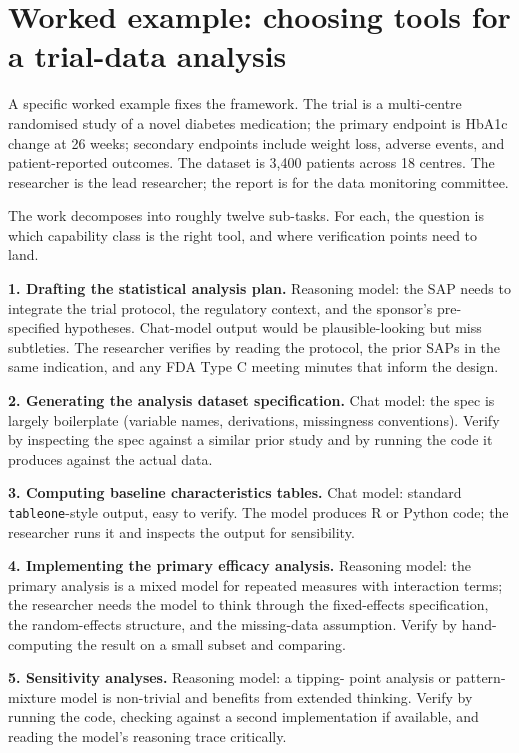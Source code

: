 \documentclass[
  letterpaper,
  11pt]{scrbook}
\begin{document}
\section{Worked example: choosing tools for a trial-data
analysis}\label{worked-example-choosing-tools-for-a-trial-data-analysis}

A specific worked example fixes the framework. The trial is a
multi-centre randomised study of a novel diabetes medication; the
primary endpoint is HbA1c change at 26 weeks; secondary endpoints
include weight loss, adverse events, and patient-reported outcomes. The
dataset is 3,400 patients across 18 centres. The researcher is the lead
researcher; the report is for the data monitoring committee.

The work decomposes into roughly twelve sub-tasks. For each, the
question is which capability class is the right tool, and where
verification points need to land.

\textbf{1. Drafting the statistical analysis plan.} Reasoning model: the
SAP needs to integrate the trial protocol, the regulatory context, and
the sponsor's pre-specified hypotheses. Chat-model output would be
plausible-looking but miss subtleties. The researcher verifies by
reading the protocol, the prior SAPs in the same indication, and any FDA
Type C meeting minutes that inform the design.

\textbf{2. Generating the analysis dataset specification.} Chat model:
the spec is largely boilerplate (variable names, derivations,
missingness conventions). Verify by inspecting the spec against a
similar prior study and by running the code it produces against the
actual data.

\textbf{3. Computing baseline characteristics tables.} Chat model:
standard \texttt{tableone}-style output, easy to verify. The model
produces R or Python code; the researcher runs it and inspects the
output for sensibility.

\textbf{4. Implementing the primary efficacy analysis.} Reasoning model:
the primary analysis is a mixed model for repeated measures with
interaction terms; the researcher needs the model to think through the
fixed-effects specification, the random-effects structure, and the
missing-data assumption. Verify by hand-computing the result on a small
subset and comparing.

\textbf{5. Sensitivity analyses.} Reasoning model: a tipping- point
analysis or pattern-mixture model is non-trivial and benefits from
extended thinking. Verify by running the code, checking against a second
implementation if available, and reading the model's reasoning trace
critically.
\end{document}
